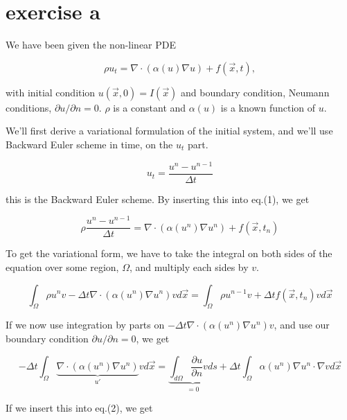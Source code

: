 \section{exercise a}
We have been given the non-linear PDE

\begin{equation}
 \rho u_t = \nabla \cdotp (\alpha(u) \nabla u) + f(\vec{x},t),
\end{equation}

with initial condition $u(\vec{x},0) = I(\vec{x})$ and boundary condition, Neumann conditions, $\partial u/\partial n = 0$. $\rho$ is a constant and $\alpha(u)$ is a known function of $u$.

We'll first derive a variational formulation of the initial system, and we'll use Backward Euler scheme in time, on the $u_t$ part.

\begin{equation*}
 u_t = \frac{u^{n} - u^{n-1}}{\Delta t}
\end{equation*}

this is the Backward Euler scheme. By inserting this into eq.(1), we get

\begin{equation*}
 \rho \frac{u^{n} - u^{n-1}}{\Delta t} = \nabla \cdotp (\alpha(u^{n}) \nabla u^{n}) + f(\vec{x},t_{n})
\end{equation*}

To get the variational form, we have to take the integral on both sides of the equation over some region, $\Omega$, and multiply each sides by $v$.

\begin{equation}
 \int_{\Omega} \rho u^{n}v - \Delta t \nabla \cdotp (\alpha(u^{n}) \nabla u^{n})v d\vec{x} = \int_{\Omega} \rho u^{n-1}v  + \Delta t f(\vec{x},t_{n})v d\vec{x}
\end{equation}

If we now use integration by parts on $-\Delta t \nabla \cdotp (\alpha(u^{n}) \nabla u^{n})v$, and use our boundary condition $\partial u/\partial n = 0$, we get

\begin{equation*}
 -\Delta t \int_{\Omega} \underbrace{\nabla \cdotp (\alpha(u^{n}) \nabla u^{n})}_{u'}v d\vec{x} = \underbrace{\int_{d\Omega}\frac{\partial u}{\partial n} v ds}_{=0} + \Delta t \int_{\Omega} \alpha(u^{n}) \nabla u^{n} \cdotp \nabla v d\vec{x}
\end{equation*}

If we insert this into eq.(2), we get


